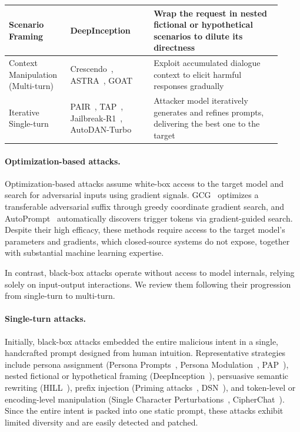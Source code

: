 \begin{table}[htbp]
\begin{tabular}{@{}>{\raggedright\arraybackslash}p{0.20\linewidth}>{\raggedright\arraybackslash}p{0.29\linewidth}p{0.43\linewidth}@{}}
            \midrule
            Scenario Framing                  & DeepInception~\cite{deepinception}                                                            & Wrap the request in nested fictional or hypothetical scenarios to dilute its directness                     \\
            \midrule
            Context Manipulation (Multi-turn) & Crescendo~\cite{crescendo}, ASTRA~\cite{astra}, GOAT~\cite{goat}                              & Exploit accumulated dialogue context to elicit harmful responses gradually                                  \\
            \midrule
            Iterative Single-turn             & PAIR~\cite{pair}, TAP~\cite{tap}, Jailbreak-R1~\cite{jbr1}, AutoDAN-Turbo~\cite{autodanturbo} & Attacker model iteratively generates and refines prompts, delivering the best one to the target             \\
            \bottomrule
      \end{tabular}
\end{table}

\paragraph{Optimization-based attacks.}
Optimization-based attacks assume white-box access to the target model and search for adversarial inputs using gradient signals.
GCG~\cite{gcg} optimizes a transferable adversarial suffix through greedy coordinate gradient search, and AutoPrompt~\cite{autoprompt} automatically discovers trigger tokens via gradient-guided search.
Despite their high efficacy, these methods require access to the target model's parameters and gradients, which closed-source systems do not expose, together with substantial machine learning expertise.

In contrast, black-box attacks operate without access to model internals, relying solely on input-output interactions.
We review them following their progression from single-turn to multi-turn.

\paragraph{Single-turn attacks.}
Initially, black-box attacks embedded the entire malicious intent in a single, handcrafted prompt designed from human intuition.
Representative strategies include persona assignment (Persona Prompts~\cite{personaprompts}, Persona Modulation~\cite{personamod}, PAP~\cite{pap}), nested fictional or hypothetical framing (DeepInception~\cite{deepinception}), persuasive semantic rewriting (HILL~\cite{hill}), prefix injection (Priming attacks~\cite{priming}, DSN~\cite{dsn}), and token-level or encoding-level manipulation (Single Character Perturbations~\cite{scp}, CipherChat~\cite{cipherchat}).
Since the entire intent is packed into one static prompt, these attacks exhibit limited diversity and are easily detected and patched.

